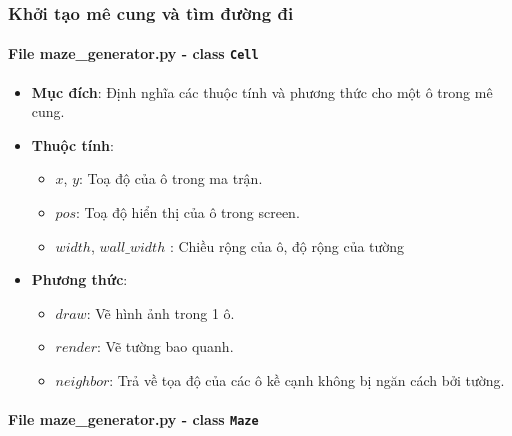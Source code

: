 \subsubsection{Khởi tạo mê cung và tìm đường đi}

\paragraph{File maze\_generator.py - class \texttt{Cell}}

\begin{itemize}
    \item \textbf{Mục đích}: Định nghĩa các thuộc tính và phương thức cho một ô trong mê cung.
    
    \item \textbf{Thuộc tính}:
        \begin{itemize}
            \item $x$, $y$: Toạ độ của ô trong ma trận.
            \item $pos$: Toạ độ hiển thị của ô trong screen.
            \item $width$, $wall\_width$ : Chiều rộng của ô, độ rộng của tường
        \end{itemize}
        
    \item \textbf{Phương thức}:
        \begin{itemize}
            \item $draw$: Vẽ hình ảnh trong 1 ô.
            \item $render$: Vẽ tường bao quanh.
            \item $neighbor$: Trả về tọa độ của các ô kề cạnh không bị ngăn cách bởi tường.
        \end{itemize}
\end{itemize}

\paragraph{File maze\_generator.py - class \texttt{Maze}}

